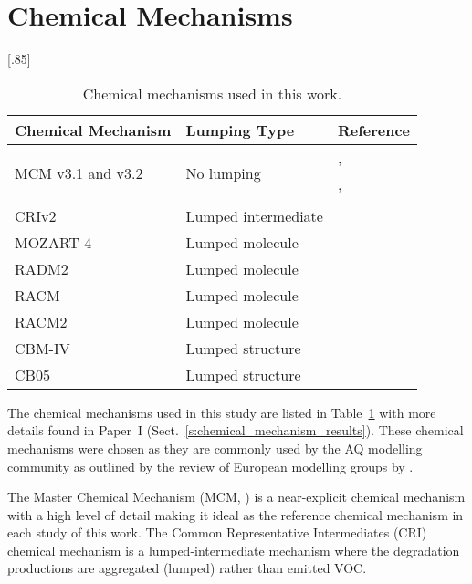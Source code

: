 \section{Chemical Mechanisms} \label{s:chemical_mechanisms}
\begin{table}[t]%
    \begin{center}%
        \caption{Chemical mechanisms used in this work.}%
        \scalebox{.85}[.85]{\begin{tabular}{lll}%
                \hline \hline
                \textbf{Chemical Mechanism} & \textbf{Lumping Type} & \textbf{Reference} \\
                \hline \hline
                \multirow{3}{*}{MCM v3.1 and v3.2} & \multirow{3}{*}{No lumping} & \citet{Jenkin:1997}, \citet{Jenkin:2003} \\
                & & \citet{Saunders:2003}, \citet{Bloss:2005} \\
                & & \citet{MCM_Site} \\
                CRIv2 & Lumped intermediate & \citet{Jenkin:2008} \\
                MOZART-4 & Lumped molecule & \citet{Emmons:2010} \\
                RADM2 & Lumped molecule & \citet{Stockwell:1990} \\
                RACM & Lumped molecule & \citet{Stockwell:1997} \\
                RACM2 & Lumped molecule & \citet{Goliff:2013} \\
                CBM-IV & Lumped structure & \citet{Gery:1989} \\
                CB05 & Lumped structure & \citet{Yarwood:2005} \\
                \hline \hline
            \end{tabular}%
        }%
        \label{t:mechanisms}%
    \end{center}%
\end{table}%
The chemical mechanisms used in this study are listed in Table~\ref{t:mechanisms} with more details found in Paper~I (Sect.~\ref{s:chemical_mechanism_results}).
These chemical mechanisms were chosen as they are commonly used by the AQ modelling community as outlined by the review of European modelling groups by \citet{Baklanov:2014}.

The Master Chemical Mechanism (MCM, \citet{Jenkin:1997, Jenkin:2003, Saunders:2003, Bloss:2005, MCM_Site}) is a near-explicit chemical mechanism with a high level of detail making it ideal as the reference chemical mechanism in each study of this work.
The Common Representative Intermediates (CRI) chemical mechanism \citep{Jenkin:2008} is a lumped-intermediate mechanism where the degradation productions are aggregated (lumped) rather than emitted VOC.

